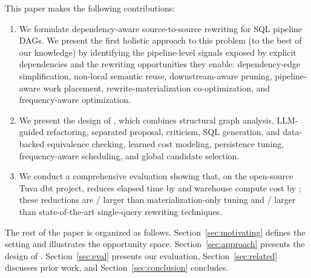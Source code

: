 This paper makes the following contributions:
\begin{enumerate}[leftmargin=*, topsep=2pt, itemsep=1pt]
    \item We formulate dependency-aware source-to-source rewriting for SQL pipeline DAGs. We present the first holistic approach to this problem (to the best of our knowledge) by identifying the pipeline-level signals exposed by explicit dependencies and the rewriting opportunities they enable: dependency-edge simplification, non-local semantic reuse, downstream-aware pruning, pipeline-aware work placement, rewrite-materialization co-optimization, and frequency-aware optimization.
    \item We present the design of \tool, which combines structural graph analysis, LLM-guided refactoring, separated proposal, criticism, SQL generation, and data-backed equivalence checking, learned cost modeling, persistence tuning, frequency-aware scheduling, and global candidate selection.
    \item We conduct a comprehensive evaluation showing that, on the open-source Tuva dbt project, \tool reduces elapsed time by  and warehouse compute cost by ; these reductions are / larger than materialization-only tuning and / larger than state-of-the-art single-query rewriting techniques.
   \end{enumerate}

The rest of the paper is organized as follows. Section~\ref{sec:motivating} defines the setting and illustrates the opportunity space. Section~\ref{sec:approach} presents the design of \tool. Section~\ref{sec:eval} presents our evaluation, Section~\ref{sec:related} discusses prior work, and Section~\ref{sec:conclusion} concludes.
